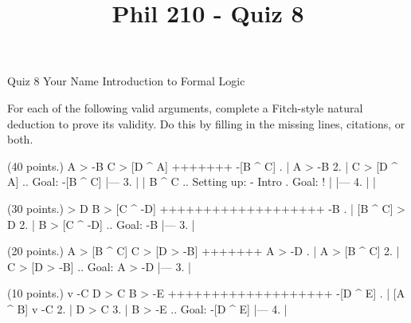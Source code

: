 
\title{Phil 210 - Quiz 8}

\heading
Quiz 8
Your Name
Introduction to Formal Logic
\endheading

For each of the following valid arguments, complete a Fitch-style natural deduction to prove its validity. Do this by filling in the missing lines, citations, or both.

\problems
{} (40 points.)
\argument
 A > -B
 C > [D ^ A]
+++++++
 -[B ^ C]
\endargument
        \answer
        . | A > -B
         2. | C > [D ^ A]  ..  Goal: -[B ^ C]
            |---
         3. |   | B ^ C    ..  Setting up: - Intro  .  Goal: ! 
            |   |---
         4. |   | 
        \endfitchproof
        \endanswer

 (30 points.)
\argument
 [B ^ C] > D
 B > [C ^ -D]
+++++++++++++++++++
 -B
\endargument
        \answer
        . | [B ^ C] > D
         2. | B > [C ^ -D]  ..  Goal: -B
            |---
         3. |
        \endfitchproof
        \endanswer

 (20 points.)
\argument
 A > [B ^ C]
 C > [D > -B]
+++++++
 A > -D
\endargument
        \answer
        . | A > [B ^ C]
         2. | C > [D > -B]  ..  Goal: A > -D
            |---
         3. | 
        \endfitchproof
        \endanswer

 (10 points.)
\argument
 [A ^ B] v -C
 D > C
 B > -E
+++++++++++++++++++
 -[D ^ E]
\endargument
        \answer
        . | [A ^ B] v -C
         2. | D > C
         3. | B > -E        ..  Goal: -[D ^ E]
            |---
         4. | 
        \endfitchproof
        \endanswer

\endproblems
\bye

